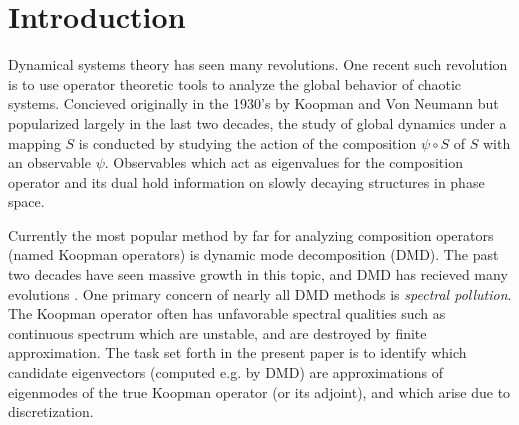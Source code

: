 
\section{Introduction}

Dynamical systems theory has seen many revolutions. One recent such revolution is to use 
operator theoretic tools to analyze the global behavior of chaotic systems. Concieved 
originally in the 1930's by Koopman and Von Neumann \cite{KoopmanOG} but popularized 
largely in the last two decades, the study of global dynamics under a mapping $S$ is 
conducted by studying the action of the composition $\psi \circ S$ of $S$ with an 
observable $\psi$. Observables which act as eigenvalues for the composition operator and 
its dual hold information on slowly decaying structures in phase space. 

Currently the most popular method by far for analyzing composition operators (named Koopman 
operators) is dynamic mode decomposition (DMD). The past two decades have seen massive growth 
in this topic, and DMD has recieved many evolutions \cite{DMDmultiverse}. One primary 
concern of nearly all DMD methods is \emph{spectral pollution}. The Koopman operator often 
has unfavorable spectral qualities such as continuous spectrum which are unstable, and are 
destroyed by finite approximation. The task set forth in the present paper is to identify 
which candidate eigenvectors (computed e.g. by DMD) are approximations of eigenmodes of 
the true Koopman operator (or its adjoint), and which arise due to discretization. 

